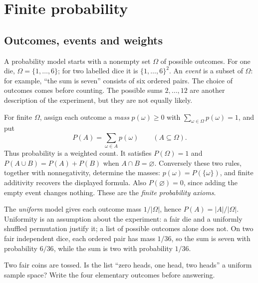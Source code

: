 
\section{Finite probability}

\subsection{Outcomes, events and weights}
A probability model starts with a nonempty set $\Omega$ of possible outcomes.
For one die, $\Omega=\{1,\ldots,6\}$; for two labelled dice it is
$\{1,\ldots,6\}^2$. An \emph{event} is a subset of $\Omega$: for example,
``the sum is seven'' consists of six ordered pairs. The choice of outcomes
comes before counting. The possible sums $2,\ldots,12$ are another description
of the experiment, but they are not equally likely.

For finite $\Omega$, assign each outcome a \emph{mass}
$p(\omega)\ge0$ with $\sum_{\omega\in\Omega}p(\omega)=1$, and put
\[
 P(A)=\sum_{\omega\in A}p(\omega)\qquad(A\subseteq\Omega).
\]
Thus probability is a weighted count. It satisfies $P(\Omega)=1$ and
$P(A\cup B)=P(A)+P(B)$ when $A\cap B=\varnothing$. Conversely these
two rules, together with nonnegativity, determine the masses:
$p(\omega)=P(\{\omega\})$, and finite additivity recovers the displayed
formula. Also $P(\varnothing)=0$, since adding the empty event changes nothing.
These are the \emph{finite probability axioms}.

The \emph{uniform} model gives each outcome mass $1/|\Omega|$, hence
$P(A)=|A|/|\Omega|$. Uniformity is an assumption about the experiment:
a fair die and a uniformly shuffled permutation justify it; a list of possible
outcomes alone does not. On two fair independent dice, each ordered pair has
mass $1/36$, so the sum is seven with probability $6/36$, while the sum is
two with probability $1/36$.

\begin{think}
Two fair coins are tossed. Is the list ``zero heads, one head, two heads'' a
uniform sample space? Write the four elementary outcomes before answering.
\end{think}

